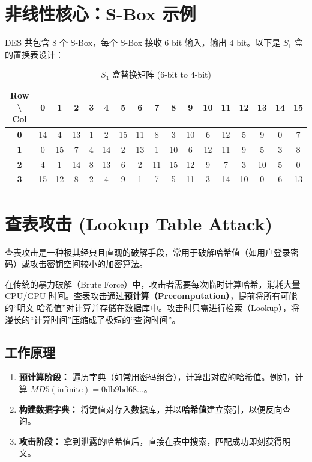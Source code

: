 \documentclass[12pt,a4paper]{article}
\begin{document}
\section{非线性核心：S-Box 示例}
DES 共包含 8 个 S-Box，每个 S-Box 接收 6 bit 输入，输出 4 bit。以下是 $S_1$ 盒的置换表设计：

\begin{table}[h]
    \centering
    \renewcommand{\arraystretch}{1.3} %
    \begin{tabular}{c|cccccccccccccccc}
        \toprule
        \rowcolor{macblue!10} %
        \textbf{Row \textbackslash{} Col} & \textbf{0} & \textbf{1} & \textbf{2} & \textbf{3} & \textbf{4} & \textbf{5} & \textbf{6} & \textbf{7} & \textbf{8} & \textbf{9} & \textbf{10} & \textbf{11} & \textbf{12} & \textbf{13} & \textbf{14} & \textbf{15} \\
        \midrule
        \textbf{0} & 14 & 4 & 13 & 1 & 2 & 15 & 11 & 8 & 3 & 10 & 6 & 12 & 5 & 9 & 0 & 7 \\
        \textbf{1} & 0 & 15 & 7 & 4 & 14 & 2 & 13 & 1 & 10 & 6 & 12 & 11 & 9 & 5 & 3 & 8 \\
        \textbf{2} & 4 & 1 & 14 & 8 & 13 & 6 & 2 & 11 & 15 & 12 & 9 & 7 & 3 & 10 & 5 & 0 \\
        \textbf{3} & 15 & 12 & 8 & 2 & 4 & 9 & 1 & 7 & 5 & 11 & 3 & 14 & 10 & 0 & 6 & 13 \\
        \bottomrule
    \end{tabular}
    \caption{$S_1$ 盒替换矩阵 (6-bit to 4-bit)}
\end{table}

\section{查表攻击 (Lookup Table Attack)}
查表攻击是一种极其经典且直观的破解手段，常用于破解哈希值（如用户登录密码）或攻击密钥空间较小的加密算法。

\begin{coreconcept}
在传统的暴力破解（Brute Force）中，攻击者需要每次临时计算哈希，消耗大量 CPU/GPU 时间。查表攻击通过\textbf{预计算（Precomputation）}，提前将所有可能的“明文-哈希值”对计算并存储在数据库中。攻击时只需进行检索（Lookup），将漫长的“计算时间”压缩成了极短的“查询时间”。
\end{coreconcept}

\subsection{工作原理}
\begin{enumerate}[label=\textbf{\arabic*.}, itemsep=5pt]
    \item \textbf{预计算阶段：} 遍历字典（如常用密码组合），计算出对应的哈希值。例如，计算 $MD5(\text{infinite}) = \text{0db9bd68...}$。
    \item \textbf{构建数据字典：} 将键值对存入数据库，并以\textbf{哈希值}建立索引，以便反向查询。
    \item \textbf{攻击阶段：} 拿到泄露的哈希值后，直接在表中搜索，匹配成功即刻获得明文。
\end{enumerate}
\end{document}
